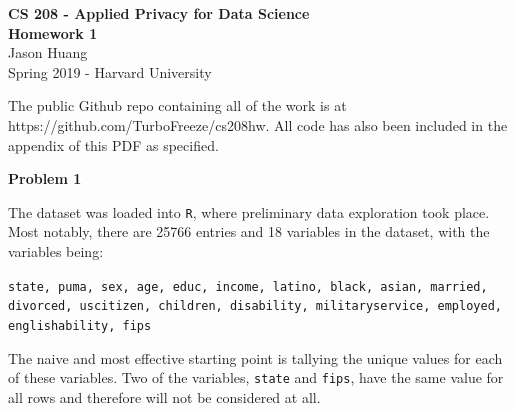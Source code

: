 \documentclass[12pt]{article}
\begin{document}
\begin{center}
	{\Large \textbf{CS 208 - Applied Privacy for Data Science}}\\
	{\Large \textbf{Homework 1}}\\
	\vspace*{0.1in}
	Jason Huang\\
	Spring 2019 - Harvard University\\
\end{center}

The public Github repo containing all of the work is at https://github.com/TurboFreeze/cs208hw. All code has also been included in the appendix of this PDF as specified.

{\large\textbf{Problem 1}}


The dataset was loaded into \texttt{R}, where preliminary data exploration took place. Most notably, there are 25766 entries and 18 variables in the dataset, with the variables being:
\begin{center}
\texttt{state, puma, sex, age, educ, income, latino, black, asian, married, divorced, uscitizen, children, disability, militaryservice, employed, englishability, fips}
\end{center}
The naive and most effective starting point is tallying the unique values for each of these variables. Two of the variables, \texttt{state} and \texttt{fips}, have the same value for all rows and therefore will not be considered at all.

\end{document}
